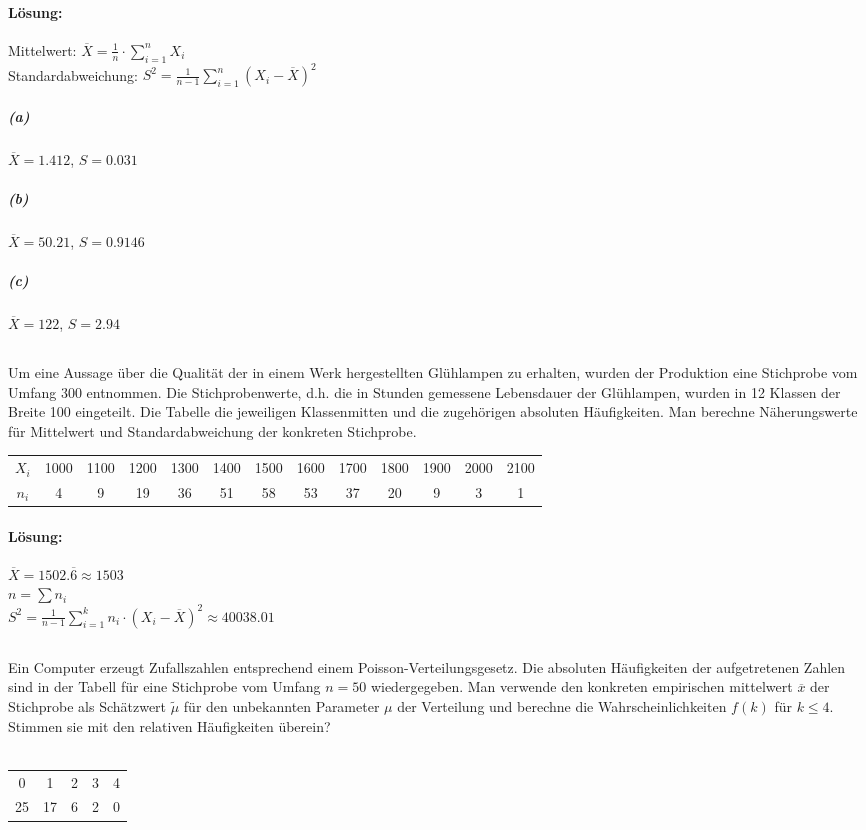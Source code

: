 \documentclass[ngerman]{scrartcl}
\begin{document}
\paragraph{Lösung:}
Mittelwert: $\overline{X}= \frac{1}{n}\cdot\sum_{i=1}^{n} X_i $\\
Standardabweichung: $S^{2} = \frac{1}{n-1}\sum_{i=1}^{n}\left(X_i - \overline{X}\right)^{2}$
\subparagraph{(a)}
$\overline{X} = 1.412$, $S = 0.031$
\subparagraph{(b)}
$\overline{X} = 50.21$, $S = 0.9146$
\subparagraph{(c)}
$\overline{X} = 122$, $S = 2.94$

\subsection{}
Um eine Aussage über die Qualität der in einem Werk hergestellten Glühlampen zu erhalten, wurden der Produktion eine Stichprobe vom Umfang 300 entnommen. Die Stichprobenwerte, d.h. die in Stunden gemessene Lebensdauer der Glühlampen, wurden in 12 Klassen der Breite 100 eingeteilt. Die Tabelle die jeweiligen Klassenmitten und die zugehörigen absoluten Häufigkeiten. Man berechne Näherungswerte für Mittelwert und Standardabweichung der konkreten Stichprobe.\\
\begin{tabular}{c c c c c c c c c c c c c}
\hline
$X_i$ & 1000 & 1100 & 1200 & 1300 & 1400 & 1500 & 1600 & 1700 & 1800 & 1900 & 2000 & 2100 \\
$n_i$ & 4 & 9 & 19 & 36 & 51 & 58 & 53 & 37 & 20 & 9 & 3 & 1 \\\hline
\end{tabular}
\paragraph{Lösung:}
$\overline{X} = 1502.\overline{6} \approx 1503$\\
$n = \sum n_i$\\
$S^{2} = \frac{1}{n-1}\sum_{i=1}^{k}  n_i \cdot (X_i - \overline{X})^{2} \approx 40038.01$ 
\subsection{}
Ein Computer erzeugt Zufallszahlen entsprechend einem Poisson-Verteilungsgesetz. Die absoluten Häufigkeiten der aufgetretenen Zahlen sind in der Tabell für eine Stichprobe vom Umfang $n=50$ wiedergegeben. Man verwende den konkreten empirischen mittelwert $\overline{x}$ der Stichprobe als Schätzwert $\tilde{\mu}$ für den unbekannten Parameter $\mu$ der Verteilung und berechne die Wahrscheinlichkeiten $f(k)$ für $k\le 4$. Stimmen sie mit den relativen Häufigkeiten überein?\\
\\
\begin{tabular}{c c c c c}
\hline
0& 1& 2& 3& 4\\
25& 17& 6& 2& 0\\\hline
\end{tabular}
\end{document}

